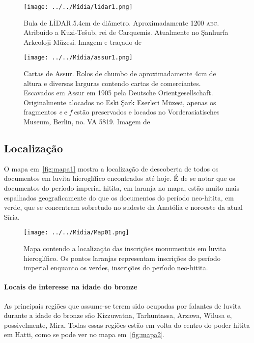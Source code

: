 \begin{figure}[htb]
	\begin{center}
		\texttt{[image: ../../Mídia/lidar1.png]}
	\end{center}
	\caption{Bula de LİDAR.\@ 5.4cm de diâmetro. Aproximadamente 1200 \textsc{aec}.
		Atribuído a Kuzi-Tešub, rei de Carquemis.
		Atualmente no Şanlıurfa Arkeoloji Müzesi.
		Imagem e traçado de~\citet[\emph{plate} 328]{CHLI13}}\label{fig:lidar1}
	\begin{center}
		\texttt{[image: ../../Mídia/assur1.png]}
	\end{center}
	\caption{Cartas de Assur. Rolos de chumbo de aproximadamente 4cm de altura e
		diversas larguras contendo cartas de comerciantes.
		Escavados em Assur em 1905 pela Deutsche Orientgesellschaft.
		Originalmente alocados no Eski Şark Eserleri Müzesi, apenas os
		fragmentos \emph{e} e \emph{f} estão preservados e locados no
		Vorderasiatisches Museum, Berlin, no. VA 5819.
		Imagem de~\citet[\emph{plate} 306]{CHLI13}
	}\label{fig:assur1}
\end{figure}

\clearpage

\subsection{Localização}

O mapa em~\autoref{fig:mapa1} mostra a localização de descoberta de todos os
documentos em luvita hieroglífico encontrados até hoje.
É de se notar que os documentos do período imperial hitita, em laranja no
mapa, estão muito mais espalhados geograficamente do que os documentos do
período neo-hitita, em verde, que se concentram sobretudo no sudeste da Anatólia
e noroeste da atual Síria.

\begin{figure}[ht!]
	\begin{center}
		\texttt{[image: ../../Mídia/Map01.png]}
	\end{center}
	\caption{Mapa contendo a localização das inscrições monumentais em luvita
		hieroglífico. Os pontos laranjas representam inscrições do período imperial
		enquanto os verdes, inscrições do período neo-hitita.}\label{fig:mapa1}
\end{figure}

\paragraph{Locais de interesse na idade do bronze}
As principais regiões que assume-se terem sido ocupadas por falantes de luvita
durante a idade do bronze são Kizzuwatna, Tarhuntassa, Arzawa, Wilusa e,
possivelmente, Mira.
Todas essas regiões estão em volta do centro do poder hitita em Hatti, como se
pode ver no mapa em~\autoref{fig:mapa2}.

